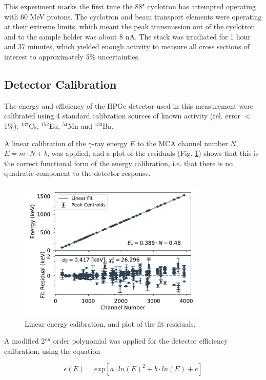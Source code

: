 \documentclass[aps,twocolumn,secnumarabic,balancelastpage,amsmath,amssymb,nofootinbib,floatfix]{revtex4-1}
\begin{document}
This experiment marks the first time the 88" cyclotron has attempted operating with 60 MeV protons.  The cyclotron and beam transport elements were operating at their extreme limits, which meant the peak transmission out of the cyclotron and to the sample holder was about 8 nA.  The stack was irradiated for 1 hour and 37 minutes, which yielded enough activity to measure all cross sections of interest to approximately 5\% uncertainties.


\subsection{Detector Calibration}

The energy and efficiency of the HPGe detector used in this measurement were calibrated using 4 standard calibration sources of known activity (rel. error $<$1\%): $^{137}$Cs, $^{152}$Eu, $^{54}$Mn and $^{133}$Ba.

A linear calibration of the $\gamma$-ray energy $E$ to the MCA channel number $N$, $E = m\cdot N+b$, was applied, and a plot of the residuals (Fig. \ref{fig:energy_calibration}) shows that this is the correct functional form of the energy calibration, i.e. that there is no quadratic component to the detector response.

\begin{figure}[htb]
\includegraphics[width=9cm]{calibration/energy_calibration.pdf}
\caption{Linear energy calibration, and plot of the fit residuals.
}
\label{fig:energy_calibration}
\end{figure}

A modified 2$^{nd}$ order polynomial was applied for the detector efficiency calibration, using the equation

\begin{equation}
\epsilon (E) = exp[a\cdot ln(E)^2+b\cdot ln(E)+c]
\end{equation}
\end{document}

